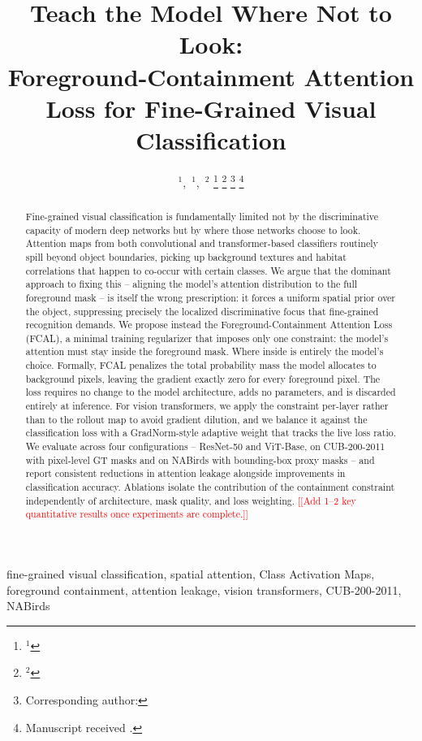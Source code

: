 \documentclass[journal]{IEEEtran}
\title{Teach the Model Where Not to Look:\\
Foreground-Containment Attention Loss for Fine-Grained Visual Classification}
\author{
  \ph{Author One}$^{1}$,~\ph{Author Two}$^{1}$,~\ph{Author Three}$^{2}$
  \thanks{$^{1}$\ph{Department, University, City, Country.}}
  \thanks{$^{2}$\ph{Department, University, City, Country.}}
  \thanks{Corresponding author: \ph{email@example.com}}
  \thanks{Manuscript received \ph{Month DD, YYYY}.}
}
\newcommand{\ph}[1]{\textcolor{red}{[#1]}}
\begin{document}
\maketitle

\begin{abstract}
Fine-grained visual classification is fundamentally limited not by
the discriminative capacity of modern deep networks but by where
those networks choose to look. Attention maps from both convolutional
and transformer-based classifiers routinely spill beyond object
boundaries, picking up background textures and habitat correlations
that happen to co-occur with certain classes. We argue that the
dominant approach to fixing this -- aligning the model's attention
distribution to the full foreground mask -- is itself the wrong
prescription: it forces a uniform spatial prior over the object,
suppressing precisely the localized discriminative focus that
fine-grained recognition demands. We propose instead the
Foreground-Containment Attention Loss (FCAL), a minimal training
regularizer that imposes only one constraint: the model's attention
must stay inside the foreground mask. Where inside is entirely the
model's choice. Formally, FCAL penalizes the total probability mass
the model allocates to background pixels, leaving the gradient
exactly zero for every foreground pixel. The loss requires no change
to the model architecture, adds no parameters, and is discarded
entirely at inference. For vision transformers, we apply the
constraint per-layer rather than to the rollout map to avoid gradient
dilution, and we balance it against the classification loss with a
GradNorm-style adaptive weight that tracks the live loss ratio. We evaluate across four configurations --
ResNet-50 and ViT-Base, on CUB-200-2011 with pixel-level GT masks
and on NABirds with bounding-box proxy masks -- and report consistent
reductions in attention leakage alongside improvements in
classification accuracy. Ablations isolate the contribution of the
containment constraint independently of architecture, mask quality,
and loss weighting.
\ph{[Add 1--2 key quantitative results once experiments are complete.]}
\end{abstract}

\begin{IEEEkeywords}
fine-grained visual classification, spatial attention, Class
Activation Maps, foreground containment, attention leakage,
vision transformers, CUB-200-2011, NABirds
\end{IEEEkeywords}
\end{document}
